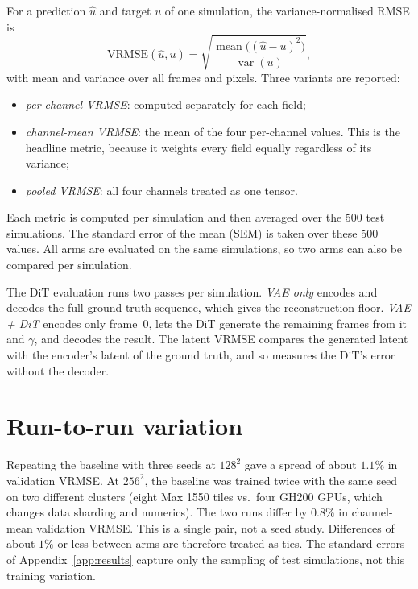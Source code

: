 For a prediction $\hat u$ and target $u$ of one simulation, the
variance-normalised RMSE is
\begin{equation}
  \mathrm{VRMSE}(\hat u, u) = \sqrt{\frac{\operatorname{mean}\bigl((\hat u - u)^2\bigr)}{\operatorname{var}(u)}} ,
\end{equation}
with mean and variance over all frames and pixels. Three variants are reported:
\begin{itemize}
  \item \emph{per-channel VRMSE}: computed separately for each field;
  \item \emph{channel-mean VRMSE}: the mean of the four per-channel values. This
        is the headline metric, because it weights every field equally
        regardless of its variance;
  \item \emph{pooled VRMSE}: all four channels treated as one tensor.
\end{itemize}
Each metric is computed per simulation and then averaged over the 500 test
simulations. The standard error of the mean (SEM) is taken over these 500
values. All arms are evaluated on the same simulations, so two arms can also be
compared per simulation.

The DiT evaluation runs two passes per simulation. \emph{VAE only} encodes and
decodes the full ground-truth sequence, which gives the reconstruction floor.
\emph{VAE + DiT} encodes only frame~0, lets the DiT generate the remaining
frames from it and $\gamma$, and decodes the result. The latent VRMSE compares
the generated latent with the encoder's latent of the ground truth, and so
measures the DiT's error without the decoder.

\section{Run-to-run variation}
\label{app:data_noise}

Repeating the baseline with three seeds at $128^2$ gave a spread of about
$1.1\%$ in validation VRMSE. At $256^2$, the baseline was trained twice with the
same seed on two different clusters (eight Max 1550 tiles vs.\ four GH200 GPUs,
which changes data sharding and numerics). The two runs differ by $0.8\%$ in
channel-mean validation VRMSE. This is a single pair, not a seed study.
Differences of about $1\%$ or less between arms are therefore treated as ties.
The standard errors of Appendix~\ref{app:results} capture only the sampling of
test simulations, not this training variation.


